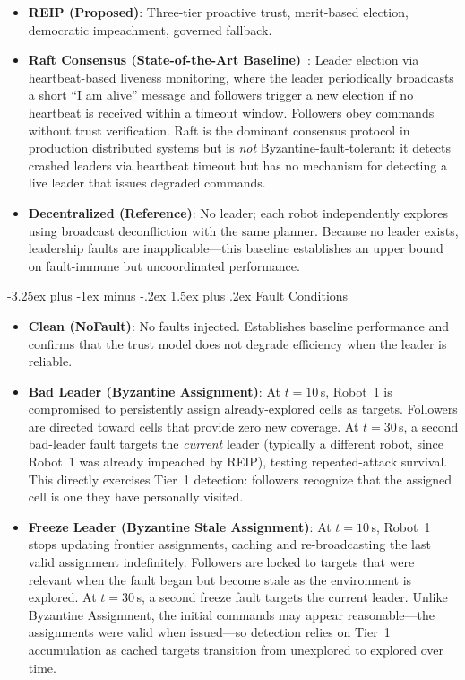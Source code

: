 \documentclass[conference]{IEEEtran}
\makeatletter
\renewcommand{\subsection}{\@startsection{subsection}{2}{\z@}%
  {-3.25ex plus -1ex minus -.2ex}%
  {1.5ex plus .2ex}%
  {\normalfont\normalsize\itshape\centering}}
\makeatother
\begin{document}
\begin{itemize}
    \item \textbf{REIP (Proposed)}: Three-tier proactive trust, merit-based election, democratic impeachment, governed fallback.
    \item \textbf{Raft Consensus (State-of-the-Art Baseline)}~\cite{ongaro2014raft}: Leader election via heartbeat-based liveness monitoring, where the leader periodically broadcasts a short ``I am alive'' message and followers trigger a new election if no heartbeat is received within a timeout window. Followers obey commands without trust verification. Raft is the dominant consensus protocol in production distributed systems but is \emph{not} Byzantine-fault-tolerant: it detects crashed leaders via heartbeat timeout but has no mechanism for detecting a live leader that issues degraded commands.
    \item \textbf{Decentralized (Reference)}: No leader; each robot independently explores using broadcast deconfliction with the same planner. Because no leader exists, leadership faults are inapplicable---this baseline establishes an upper bound on fault-immune but uncoordinated performance.
\end{itemize}

\subsection{Fault Conditions}

\begin{itemize}
    \item \textbf{Clean (NoFault)}: No faults injected. Establishes baseline performance and confirms that the trust model does not degrade efficiency when the leader is reliable.
    \item \textbf{Bad Leader (Byzantine Assignment)}: At $t{=}10\,$s, Robot~1 is compromised to persistently assign already-explored cells as targets. Followers are directed toward cells that provide zero new coverage. At $t{=}30\,$s, a second bad-leader fault targets the \emph{current} leader (typically a different robot, since Robot~1 was already impeached by REIP), testing repeated-attack survival. This directly exercises Tier~1 detection: followers recognize that the assigned cell is one they have personally visited.
    \item \textbf{Freeze Leader (Byzantine Stale Assignment)}: At $t{=}10\,$s, Robot~1 stops updating frontier assignments, caching and re-broadcasting the last valid assignment indefinitely. Followers are locked to targets that were relevant when the fault began but become stale as the environment is explored. At $t{=}30\,$s, a second freeze fault targets the current leader. Unlike Byzantine Assignment, the initial commands may appear reasonable---the assignments were valid when issued---so detection relies on Tier~1 accumulation as cached targets transition from unexplored to explored over time.
\end{itemize}
\end{document}
